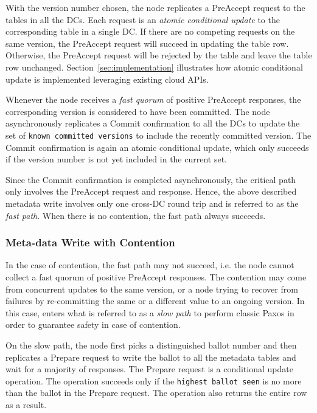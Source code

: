 With the version number chosen, the {\name} node replicates a PreAccept request
to the tables in all the DCs.
Each request is an {\em atomic conditional update} to the corresponding table in a single DC.
If there are no competing requests on the same version, the PreAccept request will succeed in updating the table row.
Otherwise, the PreAccept request will be rejected by the table and leave the table row unchanged.
Section~\ref{sec:implementation} illustrates how atomic conditional update is implemented leveraging existing cloud APIs.

Whenever the {\name} node receives a {\em fast quorum} of positive PreAccept responses,
the corresponding version is considered to have been committed.
The {\name} node asynchronously replicates a Commit confirmation to all the DCs to update 
the set of {\tt known committed versions} to include the recently committed version.
The Commit confirmation is again an atomic conditional update,
which only succeeds if the version number is not yet included in the current set.

Since the Commit confirmation is completed asynchronously,
the critical path only involves the PreAccept request and response.
Hence, the above described metadata write involves only one cross-DC round trip 
and is referred to as the {\em fast path}.  When there is no
contention, the fast path always succeeds.

\subsubsection{Meta-data Write with Contention}

In the case of contention, the fast path may not succeed, i.e. the {\name} node
cannot collect a fast quorum of positive PreAccept responses. The contention
may come from concurrent updates to the same version, or a {\name} node trying
to recover from failures by re-committing the same or a different value to an
ongoing version.  In this case, {\name} enters what is referred to as a
\emph{slow path} to perform classic Paxos in order to guarantee safety in case of
contention.

On the slow path, the {\name} node first picks a distinguished ballot number
and then replicates a Prepare request to write the ballot to all the metadata
tables and wait for a majority of responses.
The Prepare request is a conditional update operation.
The operation succeeds only if the {\tt highest ballot seen} is no more than 
the ballot in the Prepare request.
The operation also returns the entire row as a result.

